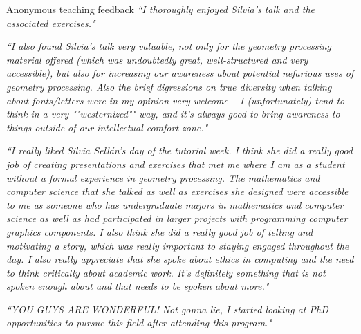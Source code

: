 \documentclass{resume}
\newcommand{\feedback}[1]{\it \small #1}
\begin{document}
\begin{rSection}{Anonymous teaching feedback}
\feedback{``I thoroughly enjoyed Silvia's talk and the associated exercises."}

\feedback{``I also found Silvia's talk very valuable, not only for the geometry processing material offered (which was undoubtedly great, well-structured and very accessible), but also for increasing our awareness about potential nefarious uses of geometry processing. Also the brief digressions on true diversity when talking about fonts/letters were in my opinion very welcome -- I (unfortunately) tend to think in a very ""westernized"" way, and it's always good to bring awareness to things outside of our intellectual comfort zone."}

\feedback{``I really liked Silvia Sellán's day of the tutorial week. I think she did a really good job of creating presentations and exercises that met me where I am as a student without a formal experience in  geometry processing. The mathematics and computer science that she talked as well as exercises she designed were accessible to me as someone who has undergraduate majors in mathematics and computer science as well as had participated in larger projects with programming computer graphics components. I also think she did a really good job of telling and motivating a story, which was really important to staying engaged throughout the day. I also really appreciate that she spoke about ethics in computing and the need to think critically about  academic work. It's definitely something that is not spoken enough about and that needs to be spoken about more."}

\feedback{``YOU GUYS ARE WONDERFUL! Not gonna lie, I started looking at PhD opportunities to pursue this field after attending this program."}

\end{rSection}
\end{document}

